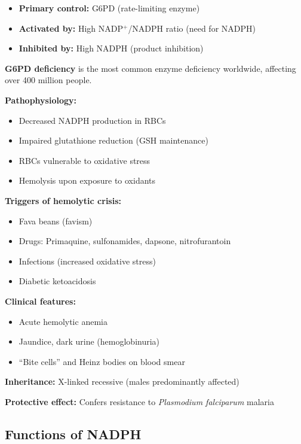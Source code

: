 \begin{itemize}
    \item \textbf{Primary control:} G6PD (rate-limiting enzyme)
    \item \textbf{Activated by:} High NADP$^+$/NADPH ratio (need for NADPH)
    \item \textbf{Inhibited by:} High NADPH (product inhibition)
\end{itemize}

\begin{tcolorbox}[colback=red!5, colframe=red!70!black, title=\textbf{Clinical Correlation: G6PD Deficiency}]
\textbf{G6PD deficiency} is the most common enzyme deficiency worldwide, affecting over 400 million people.

\textbf{Pathophysiology:}
\begin{itemize}
    \item Decreased NADPH production in RBCs
    \item Impaired glutathione reduction (GSH maintenance)
    \item RBCs vulnerable to oxidative stress
    \item Hemolysis upon exposure to oxidants
\end{itemize}

\textbf{Triggers of hemolytic crisis:}
\begin{itemize}
    \item Fava beans (favism)
    \item Drugs: Primaquine, sulfonamides, dapsone, nitrofurantoin
    \item Infections (increased oxidative stress)
    \item Diabetic ketoacidosis
\end{itemize}

\textbf{Clinical features:}
\begin{itemize}
    \item Acute hemolytic anemia
    \item Jaundice, dark urine (hemoglobinuria)
    \item ``Bite cells'' and Heinz bodies on blood smear
\end{itemize}

\textbf{Inheritance:} X-linked recessive (males predominantly affected)

\textbf{Protective effect:} Confers resistance to \textit{Plasmodium falciparum} malaria
\end{tcolorbox}

\subsection{Functions of NADPH}


